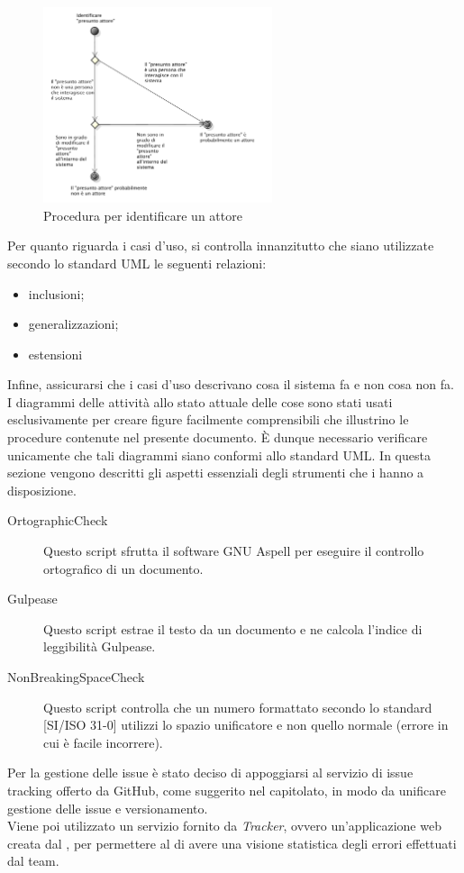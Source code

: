 				\begin{figure}[H]
					\centering
					\includegraphics[width=0.6\textwidth]{NormeDiProgetto/Pics/VerificaAttori}
					\caption{Procedura per identificare un attore}
				\end{figure}
				Per quanto riguarda i casi d'uso, si controlla innanzitutto che siano utilizzate secondo lo standard UML le seguenti relazioni:
				\begin{itemize}
					\item inclusioni;
					\item generalizzazioni;
					\item estensioni
				\end{itemize}
				Infine, assicurarsi che i casi d'uso descrivano cosa il sistema fa e non cosa non fa.
				I diagrammi delle attività allo stato attuale delle cose sono stati usati esclusivamente per creare figure facilmente comprensibili che illustrino le procedure contenute nel presente documento. È dunque necessario verificare unicamente che tali diagrammi siano conformi allo standard UML.
	\label{sec:strumentiverifica}
			In questa sezione vengono descritti gli aspetti essenziali degli strumenti che i  hanno a disposizione.
			\begin{description}
				\item[OrtographicCheck] Questo script sfrutta il software GNU Aspell per eseguire il controllo ortografico di un documento.
				\item[Gulpease] Questo script estrae il testo da un documento e ne calcola l'indice di leggibilità Gulpease.
				\item[NonBreakingSpaceCheck] Questo script controlla che un numero formattato secondo lo standard [SI/ISO 31-0] utilizzi lo spazio unificatore e non quello normale (errore in cui è facile incorrere).
			\end{description}

			Per la gestione delle issue è stato deciso di appoggiarsi al servizio di issue tracking offerto da GitHub, come suggerito nel capitolato, in modo da unificare gestione delle issue e versionamento. \\
			Viene poi utilizzato un servizio fornito da \textit{Tracker}, ovvero un'applicazione web creata dal \groupname, per permettere al  di avere una visione statistica degli errori effettuati dal team.
